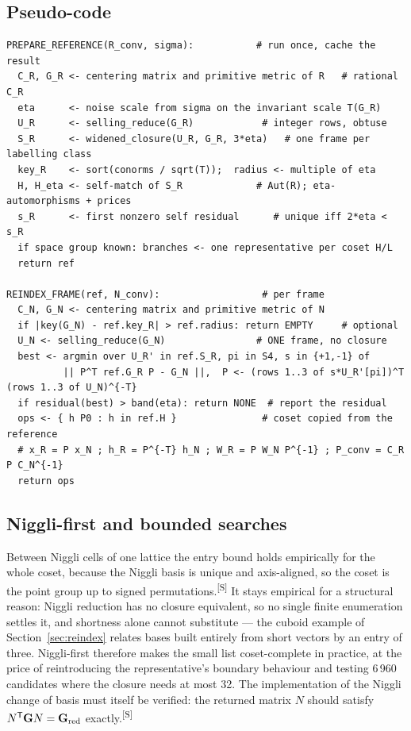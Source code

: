 \documentclass[preprint,pdf]{iucr}          %
\makeatletter
\newcommand{\Gmet}{\mathbf{G}}
\newcommand{\chk}[1]{\textsuperscript{[S\@nameuse{zn@#1}]}}
\makeatother
\begin{document}
\subsection{Pseudo-code}
\begin{small}\begin{verbatim}
PREPARE_REFERENCE(R_conv, sigma):           # run once, cache the result
  C_R, G_R <- centering matrix and primitive metric of R   # rational C_R
  eta      <- noise scale from sigma on the invariant scale T(G_R)
  U_R      <- selling_reduce(G_R)            # integer rows, obtuse
  S_R      <- widened_closure(U_R, G_R, 3*eta)   # one frame per labelling class
  key_R    <- sort(conorms / sqrt(T));  radius <- multiple of eta
  H, H_eta <- self-match of S_R             # Aut(R); eta-automorphisms + prices
  s_R      <- first nonzero self residual      # unique iff 2*eta < s_R
  if space group known: branches <- one representative per coset H/L
  return ref

REINDEX_FRAME(ref, N_conv):                  # per frame
  C_N, G_N <- centering matrix and primitive metric of N
  if |key(G_N) - ref.key_R| > ref.radius: return EMPTY     # optional
  U_N <- selling_reduce(G_N)                # ONE frame, no closure
  best <- argmin over U_R' in ref.S_R, pi in S4, s in {+1,-1} of
          || P^T ref.G_R P - G_N ||,  P <- (rows 1..3 of s*U_R'[pi])^T (rows 1..3 of U_N)^{-T}
  if residual(best) > band(eta): return NONE  # report the residual
  ops <- { h P0 : h in ref.H }               # coset copied from the reference
  # x_R = P x_N ; h_R = P^{-T} h_N ; W_R = P W_N P^{-1} ; P_conv = C_R P C_N^{-1}
  return ops
\end{verbatim}\end{small}

\subsection{Niggli-first and bounded searches}
Between Niggli cells of one lattice the entry bound holds empirically for the whole coset, because the Niggli basis is unique and axis-aligned, so the coset is the point group up to signed permutations.\chk{z:brute-complete} It stays empirical for a structural reason: Niggli reduction has no closure equivalent, so no single finite enumeration settles it, and shortness alone cannot substitute --- the cuboid example of Section~\ref{sec:reindex} relates bases built entirely from short vectors by an entry of three. Niggli-first therefore makes the small list coset-complete in practice, at the price of reintroducing the representative's boundary behaviour and testing 6\,960 candidates where the closure needs at most 32. The implementation of the Niggli change of basis must itself be verified: the returned matrix $N$ should satisfy $N^{\mathsf T}\Gmet N=\Gmet_{\rm red}$ exactly.\chk{z:brute-complete}
\end{document}
